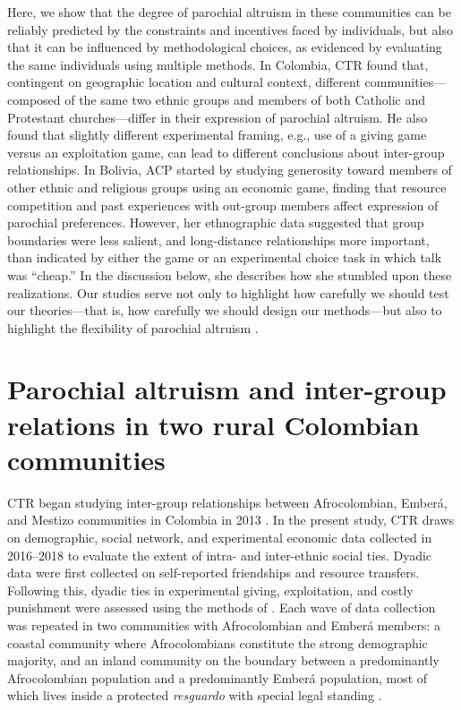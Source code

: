 \documentclass[bibauthoryear]{aa}
\begin{document}
Here, we show that the degree of parochial altruism in these communities can be reliably predicted by the constraints and incentives faced by individuals, but also that it can be influenced by methodological choices, as evidenced by evaluating the same individuals using multiple methods. In Colombia, CTR found that, contingent on  geographic location and cultural context, different communities---composed of the same two ethnic groups and members of both Catholic and Protestant churches---differ in their expression of parochial altruism. He also found that slightly different experimental framing, e.g., use of a giving game versus an exploitation game, can lead to different conclusions about inter-group relationships. In Bolivia, ACP started by studying generosity toward members of other ethnic and religious groups using an economic game, finding that resource competition and past experiences with out-group members affect expression of parochial preferences. However, her ethnographic data suggested that group boundaries were less salient, and long-distance relationships more important, than indicated by either the game or an experimental choice task in which talk was ``cheap.'' In the discussion below, she describes how she stumbled upon these realizations. Our studies serve not only to highlight how carefully we should test our theories---that is, how carefully we should design our methods---but also to highlight the flexibility of parochial altruism \citep[e.g.,][] {brewer1976ethnocentrism}.

\section{Parochial altruism and inter-group relations in two rural Colombian communities}
CTR began studying inter-group relationships between  Afrocolombian, Ember\'a, and  Mestizo communities in Colombia in 2013 \citep{ross2015frequency}. In the present study, CTR draws on demographic, social network, and experimental economic data collected in 2016--2018 to evaluate the extent of intra- and inter-ethnic social ties. Dyadic data were first collected on self-reported friendships and resource transfers. Following this, dyadic ties in experimental giving, exploitation, and costly punishment were assessed using the methods of \citet{gervais2017rich}. Each wave of data collection was repeated in two communities with Afrocolombian and Ember\'a members: a coastal community where Afrocolombians constitute the strong demographic majority, and an inland community \citep[previously studied by][]{Cay73} on the boundary between a predominantly Afrocolombian population and a predominantly Ember\'a population, most of which lives inside  a protected \emph{resguardo} with special legal standing \citep{MORAVERA2016}.
\end{document}
